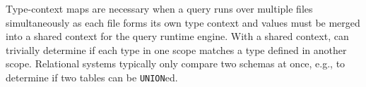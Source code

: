 Type-context maps are necessary when a query runs over multiple files simultaneously as each file forms its own type context and values must be merged into a shared context for the query runtime engine. With a shared context, \sys{} can trivially determine if each type in one scope matches a type defined in another scope. Relational systems typically only compare two schemas at once, e.g., to determine if two tables can be \texttt{UNION}ed.

\begin{comment}
\subsection{\sys{} Type Contexts} \label{ss:zed_type_contexts}

Locally scoped types raise a new challenge: how can \sys{} efficiently relate types across different scopes? For example, suppose a user wants to combine two \sys{} files into a single file. With text-based ZSON, simply concatenating the files is sufficient. However, naive concatenation of two binary \sys{} files may result in two different numeric type IDs for the same type (one from each original file), causing queries and storage formats to fail to recognize that the two types are the same. For example, the type \texttt{\{a:int32,b:string\}} may have been assigned ID 6 in the first file and 7 in the second.

\sys{} must relate types across different scopes whenever a user queries multiple files simultaneously or refers to types within a query. Relational systems typically only compare two schemas at once, e.g., to determine if two tables can be \texttt{UNION}ed. In contrast, \sys{} must determine if each value in scope B matches any type defined in scope A, a potentially quadratic number of comparisons.

\sys{} addresses this challenge using {\em type contexts}. A type context represents the set of types that are defined at a given point in a sequence of \sys{} values. As the \sys{} runtime parses a file, it builds up a representation of the type context in memory, caching a mapping from each type definition to its numeric ID and vice versa. As the runtime parses data in a second scope, for each value it encounters with type \texttt{T}, it checks the existing type context to see if \texttt{T} is already defined. For example, the runtime may discover that \texttt{\{a:int32,b:string\}} has already been assigned a type ID of 6 and then re-encode the value with the type ID of 6, instead of its original 7. If \texttt{T} is not yet defined in the type context, the runtime creates a new type definition with the next available type ID. This ensures that a given type is assigned the same ID throughout a file. Because each type context lookup takes constant time, merging type contexts takes time linear in the number of data values.
\end{comment}